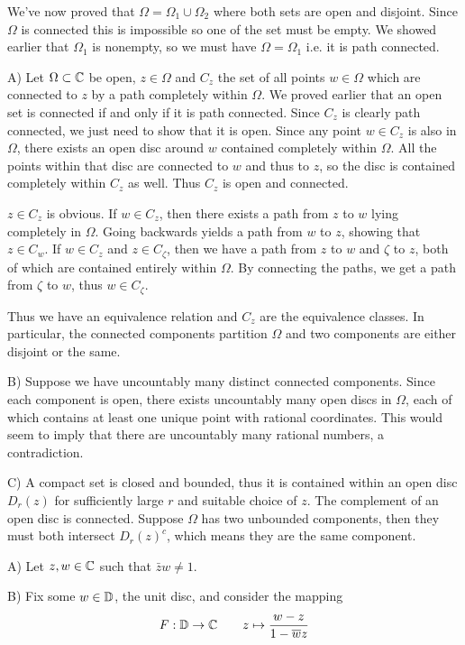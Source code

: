 \begin{exercise}
	We've now proved that $\Omega = \Omega_1 \cup \Omega_2$ where both sets are open and disjoint. Since $\Omega$ is connected this is impossible so one of the set must be empty. We showed earlier that $\Omega_1$ is nonempty, so we must have $\Omega = \Omega_1$ i.e. it is path connected.
\end{exercise}

\begin{exercise}
	A) Let $\Omega \subset \mathbb{C}$ be open, $z \in \Omega$ and $C_z$ the set of all points $w \in \Omega$ which are connected to $z$ by a path completely within $\Omega$. We proved earlier that an open set is connected if and only if it is path connected. Since $C_z$ is clearly path connected, we just need to show that it is open. Since any point $w \in C_z$ is also in $\Omega$, there exists an open disc around $w$ contained completely within $\Omega$. All the points within that disc are connected to $w$ and thus to $z$, so the disc is contained completely within $C_z$ as well. Thus $C_z$ is open and connected.
	
	$z \in C_z$ is obvious. If $w \in C_z$, then there exists a path from $z$ to $w$ lying completely in $\Omega$. Going backwards yields a path from $w$ to $z$, showing that $z \in C_w$. If $w \in C_z$ and $z \in C_\zeta$, then we have a path from $z$ to $w$ and $\zeta$ to $z$, both of which are contained entirely within $\Omega$. By connecting the paths, we get a path from $\zeta$ to $w$, thus $w \in C_\zeta$.
	
	Thus we have an equivalence relation and $C_z$ are the equivalence classes. In particular, the connected components partition $\Omega$ and two components are either disjoint or the same.
	
	B) Suppose we have uncountably many distinct connected components. Since each component is open, there exists uncountably many open discs in $\Omega$, each of which contains at least one unique point with rational coordinates. This would seem to imply that there are uncountably many rational numbers, a contradiction.
	
	C) A compact set is closed and bounded, thus it is contained within an open disc $D_r(z)$ for sufficiently large $r$ and suitable choice of $z$. The complement of an open disc is connected. Suppose $\Omega$ has two unbounded components, then they must both intersect $D_r(z)^c$, which means they are the same component.
\end{exercise}

\begin{exercise}
	A) Let $z, w \in \mathbb{C}$ such that $\bar zw \neq 1$. 
	
	B) Fix some $w \in \mathbb{D}$, the unit disc, and consider the mapping
	\[ F:\mathbb{D} \to \mathbb{C} \qquad z \mapsto \frac{w - z}{1 - \overline{w}z} \]
\end{exercise}

